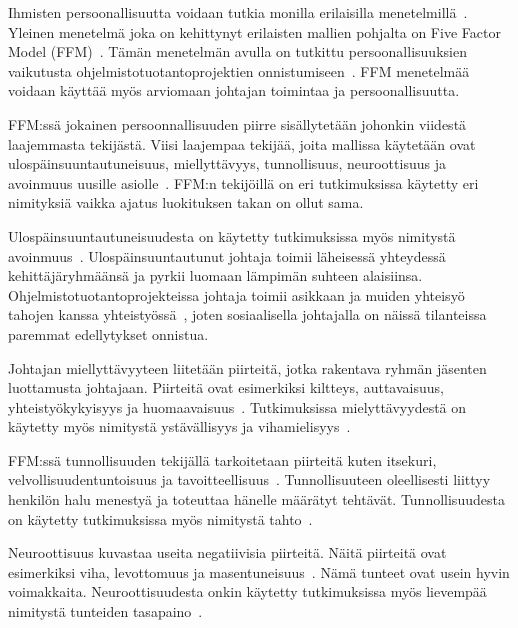 \documentclass[finnish]{tktltiki2}
\theoremstyle{definition}
\theoremstyle{remark}
\begin{document}
Ihmisten persoonallisuutta voidaan tutkia monilla erilaisilla menetelmillä~\cite{digman1990personality}. Yleinen menetelmä joka on kehittynyt erilaisten mallien pohjalta on Five Factor Model (FFM)~\cite{digman1990personality, barrick2006big}. Tämän menetelmän avulla on tutkittu persoonallisuuksien vaikutusta ohjelmistotuotantoprojektien onnistumiseen~\cite{Wang:2009:PMP:1639950.1640049}. FFM menetelmää voidaan käyttää myös arviomaan johtajan toimintaa ja persoonallisuutta.

FFM:ssä jokainen persoonnallisuuden piirre sisällytetään johonkin viidestä laajemmasta tekijästä. Viisi laajempaa tekijää, joita mallissa käytetään ovat  ulospäinsuuntautuneisuus, miellyttävyys, tunnollisuus, neuroottisuus ja avoinmuus uusille asiolle~\cite{barrick2006big, digman1990personality}. FFM:n tekijöillä on eri tutkimuksissa käytetty eri nimityksiä vaikka ajatus luokituksen takan on ollut sama.  

Ulospäinsuuntautuneisuudesta  on käytetty tutkimuksissa myös nimitystä avoinmuus~\cite{digman1990personality}. Ulospäinsuuntautunut johtaja toimii läheisessä yhteydessä kehittäjäryhmäänsä ja pyrkii luomaan lämpimän suhteen alaisiinsa. Ohjelmistotuotantoprojekteissa johtaja toimii asikkaan ja muiden yhteisyö tahojen kanssa yhteistyössä~\cite{McLeod:2011:FAS:1978802.1978803}, joten sosiaalisella johtajalla on näissä tilanteissa paremmat edellytykset onnistua.  

Johtajan miellyttävyyteen liitetään piirteitä, jotka rakentava ryhmän jäsenten luottamusta johtajaan. Piirteitä ovat esimerkiksi kiltteys, auttavaisuus, yhteistyökykyisyys ja huomaavaisuus~\cite{Wang:2009:PMP:1639950.1640049}. Tutkimuksissa mielyttävyydestä on käytetty myös nimitystä ystävällisyys ja vihamielisyys~\cite{digman1990personality}. 

FFM:ssä tunnollisuuden tekijällä tarkoitetaan piirteitä kuten itsekuri, velvollisuudentuntoisuus ja tavoitteellisuus~\cite{Wang:2009:PMP:1639950.1640049}. Tunnollisuuteen oleellisesti liittyy henkilön halu menestyä ja toteuttaa hänelle määrätyt tehtävät. Tunnollisuudesta on käytetty tutkimuksissa myös nimitystä tahto~\cite{digman1990personality}. 

Neuroottisuus kuvastaa useita negatiivisia piirteitä. Näitä piirteitä ovat esimerkiksi viha, levottomuus ja masentuneisuus~\cite{Wang:2009:PMP:1639950.1640049}. Nämä tunteet ovat usein hyvin voimakkaita. Neuroottisuudesta onkin käytetty tutkimuksissa myös lievempää nimitystä tunteiden tasapaino~\cite{digman1990personality}. 
\end{document}
